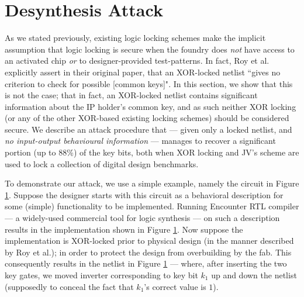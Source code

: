 \section{Desynthesis Attack}

As we stated previously, existing logic locking schemes make the implicit assumption that logic locking is secure when the foundry does \emph{not} have access to an activated chip \emph{or} to designer-provided test-patterns. In fact, Roy et al. explicitly assert in their original paper, that an XOR-locked netlist ``gives no criterion to check for possible [common keys]"\cite{}.  In this section, we show that this is not the case; that in fact, an XOR-locked netlist contains significant information about the IP holder's common key, and as such neither XOR locking (or any of the other XOR-based existing locking schemes) should be considered secure. We describe an attack procedure that --- given only a locked netlist, and \emph{no input-output behavioural information} --- manages to recover a significant portion  (up to 88\%) of the key bits, both when XOR locking and JV's scheme are used to lock a collection of digital design benchmarks. 

To demonstrate our attack, we use a simple example, namely the circuit in Figure \ref{}. Suppose the designer starts with this circuit as a behavioral description for some (simple) functionality to be implemented. Running Encounter RTL compiler --- a widely-used \cite{} commercial tool for logic synthesis --- on such a description results in the implementation shown in Figure \ref{}. Now suppose the implementation is XOR-locked prior to physical design (in the manner described by Roy et al.); in order to protect the design from overbuilding by the fab. This consequently results in the netlist in Figure \ref{} --- where, after inserting the two key gates, we moved inverter corresponding to key bit $k_1$ up and down the netlist (supposedly to conceal the fact that $k_1$'s correct value is $1$).

